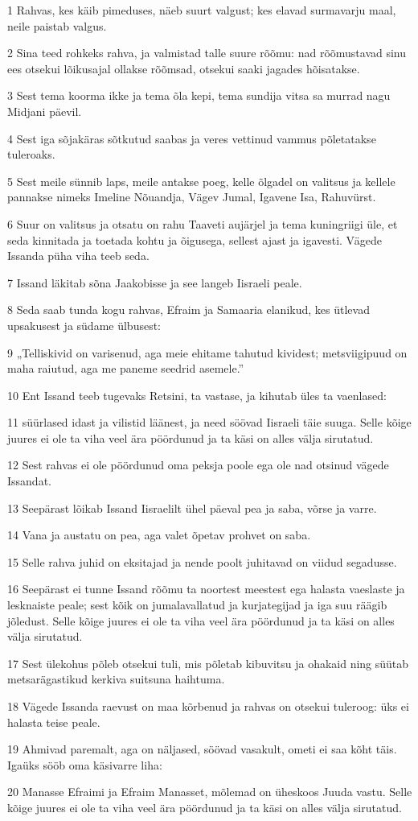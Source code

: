 \par 1 Rahvas, kes käib pimeduses, näeb suurt valgust; kes elavad surmavarju maal, neile paistab valgus.
\par 2 Sina teed rohkeks rahva, ja valmistad talle suure rõõmu: nad rõõmustavad sinu ees otsekui lõikusajal ollakse rõõmsad, otsekui saaki jagades hõisatakse.
\par 3 Sest tema koorma ikke ja tema õla kepi, tema sundija vitsa sa murrad nagu Midjani päevil.
\par 4 Sest iga sõjakäras sõtkutud saabas ja veres vettinud vammus põletatakse tuleroaks.
\par 5 Sest meile sünnib laps, meile antakse poeg, kelle õlgadel on valitsus ja kellele pannakse nimeks Imeline Nõuandja, Vägev Jumal, Igavene Isa, Rahuvürst.
\par 6 Suur on valitsus ja otsatu on rahu Taaveti aujärjel ja tema kuningriigi üle, et seda kinnitada ja toetada kohtu ja õigusega, sellest ajast ja igavesti. Vägede Issanda püha viha teeb seda.
\par 7 Issand läkitab sõna Jaakobisse ja see langeb Iisraeli peale.
\par 8 Seda saab tunda kogu rahvas, Efraim ja Samaaria elanikud, kes ütlevad upsakusest ja südame ülbusest:
\par 9 „Telliskivid on varisenud, aga meie ehitame tahutud kividest; metsviigipuud on maha raiutud, aga me paneme seedrid asemele.”
\par 10 Ent Issand teeb tugevaks Retsini, ta vastase, ja kihutab üles ta vaenlased:
\par 11 süürlased idast ja vilistid läänest, ja need söövad Iisraeli täie suuga. Selle kõige juures ei ole ta viha veel ära pöördunud ja ta käsi on alles välja sirutatud.
\par 12 Sest rahvas ei ole pöördunud oma peksja poole ega ole nad otsinud vägede Issandat.
\par 13 Seepärast lõikab Issand Iisraelilt ühel päeval pea ja saba, võrse ja varre.
\par 14 Vana ja austatu on pea, aga valet õpetav prohvet on saba.
\par 15 Selle rahva juhid on eksitajad ja nende poolt juhitavad on viidud segadusse.
\par 16 Seepärast ei tunne Issand rõõmu ta noortest meestest ega halasta vaeslaste ja lesknaiste peale; sest kõik on jumalavallatud ja kurjategijad ja iga suu räägib jõledust. Selle kõige juures ei ole ta viha veel ära pöördunud ja ta käsi on alles välja sirutatud.
\par 17 Sest ülekohus põleb otsekui tuli, mis põletab kibuvitsu ja ohakaid ning süütab metsarägastikud kerkiva suitsuna haihtuma.
\par 18 Vägede Issanda raevust on maa kõrbenud ja rahvas on otsekui tuleroog: üks ei halasta teise peale.
\par 19 Ahmivad paremalt, aga on näljased, söövad vasakult, ometi ei saa kõht täis. Igaüks sööb oma käsivarre liha:
\par 20 Manasse Efraimi ja Efraim Manasset, mõlemad on üheskoos Juuda vastu. Selle kõige juures ei ole ta viha veel ära pöördunud ja ta käsi on alles välja sirutatud.

